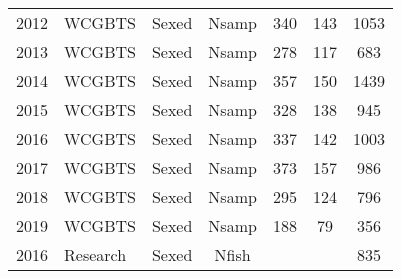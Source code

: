 \begin{longtable}[t]{c>{\centering\arraybackslash}p{3cm}ccccc}
2012 & WCGBTS & Sexed & Nsamp & 340 & 143 & 1053\\
2013 & WCGBTS & Sexed & Nsamp & 278 & 117 & 683\\
2014 & WCGBTS & Sexed & Nsamp & 357 & 150 & 1439\\
2015 & WCGBTS & Sexed & Nsamp & 328 & 138 & 945\\
2016 & WCGBTS & Sexed & Nsamp & 337 & 142 & 1003\\
2017 & WCGBTS & Sexed & Nsamp & 373 & 157 & 986\\
2018 & WCGBTS & Sexed & Nsamp & 295 & 124 & 796\\
2019 & WCGBTS & Sexed & Nsamp & 188 & 79 & 356\\
2016 & Research & Sexed & Nfish &  &  & 835\\*
\end{longtable}
\endgroup{}
\endgroup{}
